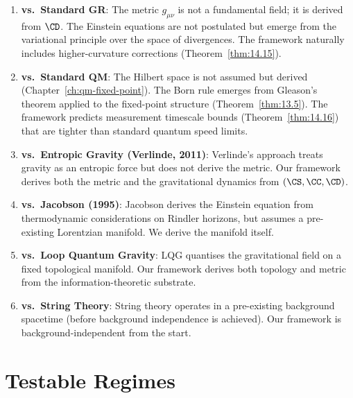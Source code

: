 \begin{remark}
\begin{enumerate}
  \item \textbf{vs.\ Standard GR}: The metric $g_{\mu\nu}$ is not
        a fundamental field; it is derived from $\CD$.  The Einstein
        equations are not postulated but emerge from the variational
        principle over the space of divergences.  The framework
        naturally includes higher-curvature corrections
        (Theorem~\ref{thm:14.15}).

  \item \textbf{vs.\ Standard QM}: The Hilbert space is not assumed
        but derived (Chapter~\ref{ch:qm-fixed-point}).  The Born rule
        emerges from Gleason's theorem applied to the fixed-point
        structure (Theorem~\ref{thm:13.5}).  The framework predicts
        measurement timescale bounds (Theorem~\ref{thm:14.16}) that are
        tighter than standard quantum speed limits.

  \item \textbf{vs.\ Entropic Gravity (Verlinde, 2011)}: Verlinde's
        approach treats gravity as an entropic force but does not
        derive the metric.  Our framework derives both the metric and
        the gravitational dynamics from $(\CS, \CC, \CD)$.

  \item \textbf{vs.\ Jacobson (1995)}: Jacobson derives the Einstein
        equation from thermodynamic considerations on Rindler horizons,
        but assumes a pre-existing Lorentzian manifold.  We derive the
        manifold itself.

  \item \textbf{vs.\ Loop Quantum Gravity}: LQG quantises the
        gravitational field on a fixed topological manifold.  Our
        framework derives both topology and metric from the
        information-theoretic substrate.

  \item \textbf{vs.\ String Theory}: String theory operates in a
        pre-existing background spacetime (before background independence
        is achieved).  Our framework is background-independent from the
        start.
\end{enumerate}
\end{remark}

\section{Testable Regimes}
\label{sec:ch15:testable}

